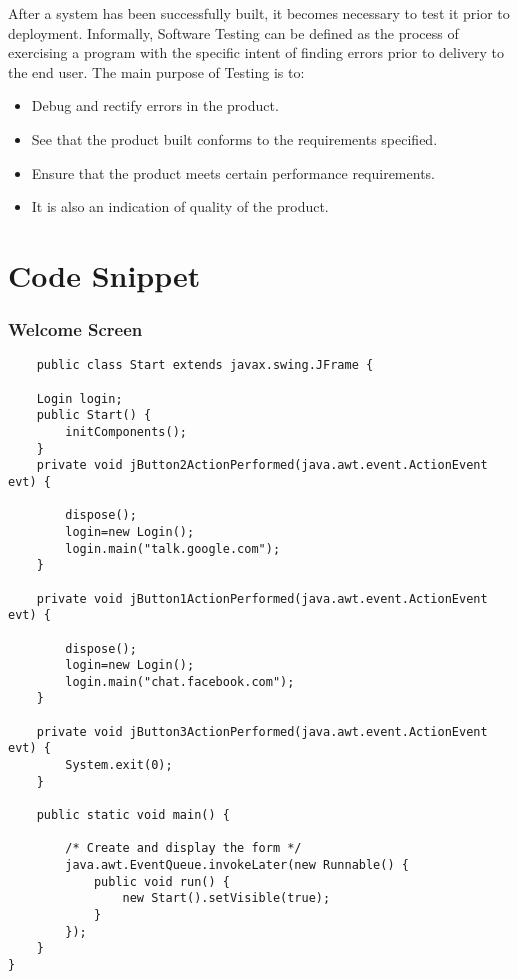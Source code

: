 \documentclass{SureshLimkar}
\begin{document}
\hspace{0.5 in}After a system has been successfully built, it becomes necessary to test it prior to deployment. Informally, Software Testing can be defined as the process of exercising a program with the specific intent of finding errors prior to delivery to the end user. The main purpose of Testing is to:
\begin{itemize}
 \item Debug and rectify errors in the product.
\item See that the product built conforms to the requirements specified.
\item Ensure that the product meets certain performance requirements.
\item It is also an indication of quality of the product.
\end{itemize}


\chapter{Code Snippet}

\subsection{Welcome Screen}
\begin{lstlisting}
    public class Start extends javax.swing.JFrame {

    Login login;
    public Start() {
        initComponents();
    }
    private void jButton2ActionPerformed(java.awt.event.ActionEvent evt) {
    
	    dispose();
		login=new Login();
	    login.main("talk.google.com");
    }

    private void jButton1ActionPerformed(java.awt.event.ActionEvent evt) {
        
       	dispose();
		login=new Login();
        login.main("chat.facebook.com");
    }

    private void jButton3ActionPerformed(java.awt.event.ActionEvent evt) {
        System.exit(0);
    }
    
    public static void main() {
    
        /* Create and display the form */
        java.awt.EventQueue.invokeLater(new Runnable() {
            public void run() {
                new Start().setVisible(true);
            }
        });
    }
}
\end{lstlisting}
\newpage
\end{document}
